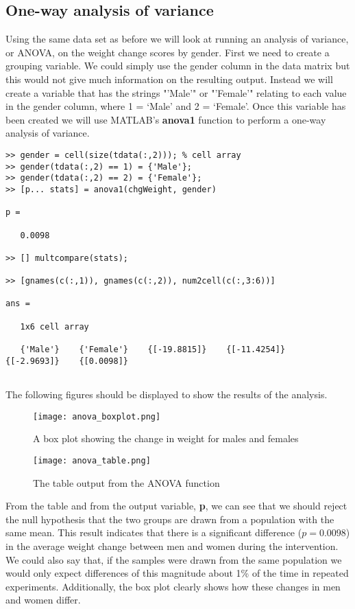 \documentclass[12pt,a4paper]{article}
\begin{document}
\subsection{One-way analysis of variance}
Using the same data set as before we will look at running an analysis of variance, or ANOVA, on the weight change scores by gender.  
First we need to create a grouping variable.  
We could simply use the gender column in the data matrix but this would not give much information on the resulting output.  
Instead we will create a variable that has the strings "'Male'" or "'Female'" relating to each value in the gender column, where 1 = `Male' and 2 = `Female'.  
Once this variable has been created we will use MATLAB's \textbf{anova1} function to perform a one-way analysis of variance.
\begin{lstlisting}[style=Matlab-editor]
>> gender = cell(size(tdata(:,2))); % cell array
>> gender(tdata(:,2) == 1) = {'Male'};		
>> gender(tdata(:,2) == 2) = {'Female'};		
>> [p... stats] = anova1(chgWeight, gender)

p =
   
   0.0098
   
>> [] multcompare(stats);
   
>> [gnames(c(:,1)), gnames(c(:,2)), num2cell(c(:,3:6))]

ans =

   1x6 cell array
	
   {'Male'}    {'Female'}    {[-19.8815]}    {[-11.4254]}    {[-2.9693]}    {[0.0098]}
	
\end{lstlisting}
The following figures should be displayed to show the results of the analysis.
\begin{figure}[H]
	\begin{center}
		\texttt{[image: anova\_boxplot.png]}
		\caption{A box plot showing the change in weight for males and females}
		\label{fig:anova_boxplot}
	\end{center}
\end{figure}
\begin{figure}[H]
	\begin{center}
		\texttt{[image: anova\_table.png]}
		\caption{The table output from the ANOVA function}
		\label{fig:anova_table}
	\end{center}
\end{figure}
From the table and from the output variable, \textbf{p}, we can see that we should reject the null hypothesis that the two groups are drawn from a population with the same mean.  
This result indicates that there is a significant difference ($p = 0.0098$) in the average weight change between men and women during the intervention.
We could also say that, if the samples were drawn from the same population we would only expect differences of this magnitude about 1\% of the time in repeated experiments.
Additionally, the box plot clearly shows how these changes in men and women differ.
\end{document}
